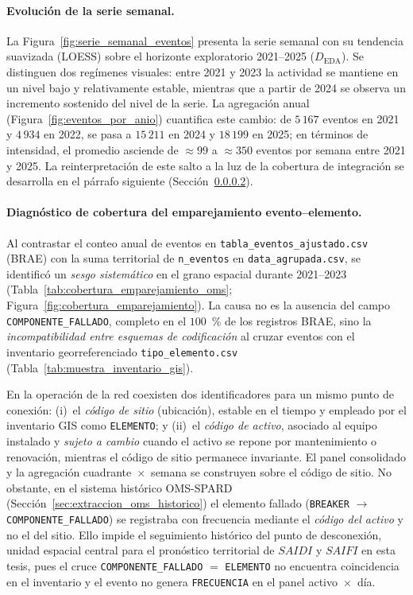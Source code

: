     \paragraph{Evolución de la serie semanal.} La Figura~\ref{fig:serie_semanal_eventos} presenta la serie semanal con su tendencia suavizada (LOESS) sobre el horizonte exploratorio 2021--2025 ($D_{\mathrm{EDA}}$). Se distinguen dos regímenes visuales: entre 2021 y 2023 la actividad se mantiene en un nivel bajo y relativamente estable, mientras que a partir de 2024 se observa un incremento sostenido del nivel de la serie. La agregación anual (Figura~\ref{fig:eventos_por_anio}) cuantifica este cambio: de $5\,167$ eventos en 2021 y $4\,934$ en 2022, se pasa a $15\,211$ en 2024 y $18\,199$ en 2025; en términos de intensidad, el promedio asciende de $\approx 99$ a $\approx 350$ eventos por semana entre 2021 y 2025. La reinterpretación de este salto a la luz de la cobertura de integración se desarrolla en el párrafo siguiente (Sección~\ref{sec:delimitacion_temporal_modelado}).
    
    
    
    \paragraph{Diagnóstico de cobertura del emparejamiento evento--elemento.}
    \label{sec:delimitacion_temporal_modelado}
    
    Al contrastar el conteo anual de eventos en \texttt{tabla\_eventos\_ajustado.csv} (BRAE) con la suma territorial de \texttt{n\_eventos} en \texttt{data\_agrupada.csv}, se identificó un \textit{sesgo sistemático} en el grano espacial durante 2021--2023 (Tabla~\ref{tab:cobertura_emparejamiento_oms}; Figura~\ref{fig:cobertura_emparejamiento}). La causa no es la ausencia del campo \texttt{COMPONENTE\_FALLADO}, completo en el $100$~\% de los registros BRAE, sino la \textit{incompatibilidad entre esquemas de codificación} al cruzar eventos con el inventario georreferenciado \texttt{tipo\_elemento.csv} (Tabla~\ref{tab:muestra_inventario_gis}).
    
    En la operación de la red coexisten dos identificadores para un mismo punto de conexión: (i)~el \textit{código de sitio} (ubicación), estable en el tiempo y empleado por el inventario GIS como \texttt{ELEMENTO}; y (ii)~el \textit{código de activo}, asociado al equipo instalado y \textit{sujeto a cambio} cuando el activo se repone por mantenimiento o renovación, mientras el código de sitio permanece invariante. El panel consolidado y la agregación cuadrante~$\times$~semana se construyen sobre el código de sitio. No obstante, en el sistema histórico OMS-SPARD (Sección~\ref{sec:extraccion_oms_historico}) el elemento fallado (\texttt{BREAKER} $\rightarrow$ \texttt{COMPONENTE\_FALLADO}) se registraba con frecuencia mediante el \textit{código del activo} y no el del sitio. Ello impide el seguimiento histórico del punto de desconexión, unidad espacial central para el pronóstico territorial de $SAIDI$ y $SAIFI$ en esta tesis, pues el cruce \texttt{COMPONENTE\_FALLADO} $=$ \texttt{ELEMENTO} no encuentra coincidencia en el inventario y el evento no genera \texttt{FRECUENCIA} en el panel activo~$\times$~día.
    
